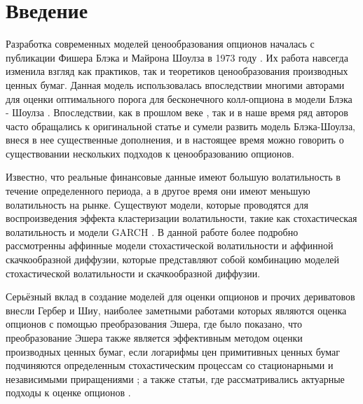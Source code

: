 \documentclass[a4paper,12pt]{article}
\theoremstyle{definition}
\begin{document}
\enlargethispage{4\baselineskip}
\thispagestyle{empty} %
\newpage

\thispagestyle{empty}

\newpage
\tableofcontents

\newpage

\section{Введение}

Разработка современных моделей ценообразования опционов началась с публикации Фишера Блэка и Майрона Шоулза в 1973 году \cite{bib:Black_Scholes}. Их работа навсегда изменила взгляд как практиков, так и теоретиков ценообразования производных ценных бумаг. Данная модель использовалась впоследствии многими авторами для оценки оптимального порога для бесконечного колл-опциона в модели Блэка - Шоулза \cite{bib:Perpetual_Mart1, bib:Perpetual_Mart2}. Впоследствии, как в прошлом веке \cite{bib:Musiela1997}, так и в наше время \cite{bib:BSModification} ряд авторов часто обращались к оригинальной статье и сумели развить модель Блэка-Шоулза, внеся в нее существенные дополнения, и в настоящее время можно говорить о существовании нескольких подходов к ценообразованию опционов.

Известно, что реальные финансовые данные имеют большую волатильность в течение определенного периода, а в другое время они имеют меньшую волатильность на рынке. Существуют модели, которые проводятся для воспроизведения эффекта кластеризации волатильности, такие как стохастическая волатильность и модели GARCH \cite{bib:GARCH}.  В данной работе более подробно рассмотренны аффинные модели стохастической волатильности и аффинной скачкообразной диффузии, которые представляют собой комбинацию моделей стохастической волатильности и скачкообразной диффузии.

Серьёзный вклад в создание моделей для оценки опционов и прочих дериватовов внесли Гербер и Шиу, наиболее заметными работами которых являются оценка опционов с помощью преобразования Эшера, где было показано, что преобразование Эшера также является эффективным методом оценки производных ценных бумаг, если логарифмы цен примитивных ценных бумаг подчиняются определенным стохастическим процессам со стационарными и независимыми приращениями \cite{bib:GerberShiu_Esscher}; а также статьи, где рассматривались актуарные подходы к оценке опционов \cite{bib:GerberShiu_Actuarial_1, bib:GerberShiu_Actuarial_2, bib:GerberShiu_Actuarial_3}. 
\end{document}

